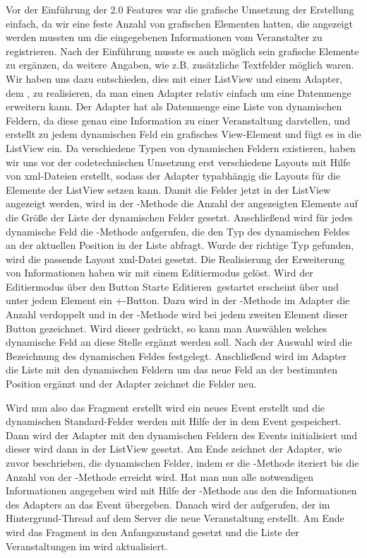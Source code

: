 Vor der Einführung der 2.0 Features war die grafische Umsetzung der Erstellung einfach, da wir eine feste Anzahl von grafischen Elementen hatten, die angezeigt werden mussten um die eingegebenen Informationen vom Veranstalter zu registrieren. Nach der Einführung musste es auch möglich sein grafische Elemente zu ergänzen, da weitere Angaben, wie z.B. zusätzliche Textfelder möglich waren. Wir haben uns dazu entschieden, dies mit einer ListView und einem Adapter, dem , zu realisieren, da man einen Adapter relativ einfach um eine Datenmenge erweitern kann. Der Adapter hat als Datenmenge eine Liste von dynamischen Feldern, da diese genau eine Information zu einer Veranstaltung darstellen, und erstellt zu jedem dynamischen Feld ein grafisches View-Element und fügt es in die ListView ein. Da verschiedene Typen von dynamischen Feldern existieren, haben wir uns vor der codetechnischen Umsetzung erst verschiedene Layouts mit Hilfe von xml-Dateien erstellt, sodass der Adapter typabhängig die Layouts für die Elemente der ListView setzen kann. Damit die Felder jetzt in der ListView angezeigt werden, wird in der -Methode die Anzahl der angezeigten Elemente auf die Größe der Liste der dynamischen Felder gesetzt. Anschließend wird für jedes dynamische Feld die -Methode aufgerufen, die den Typ des dynamischen Feldes an der aktuellen Position in der Liste abfragt. Wurde der richtige Typ gefunden, wird die passende Layout xml-Datei gesetzt. Die Realisierung der Erweiterung von Informationen haben wir mit einem Editiermodus gelöst. Wird der Editiermodus über den Button \glqq Starte Editieren\grqq\ gestartet erscheint über und unter jedem Element ein \glqq$+$\grqq-Button. Dazu wird in der -Methode im Adapter die Anzahl verdoppelt und in der -Methode wird bei jedem zweiten Element dieser Button gezeichnet. Wird dieser gedrückt, so kann man Auswählen welches dynamische Feld an diese Stelle ergänzt werden soll. Nach der Auswahl wird die Bezeichnung des dynamischen Feldes festgelegt. Anschließend wird im Adapter die Liste mit den dynamischen Feldern um das neue Feld an der bestimmten Position ergänzt und der Adapter zeichnet die Felder neu.

Wird nun also das Fragment erstellt wird ein neues Event erstellt und die dynamischen Standard-Felder werden mit Hilfe der  in dem Event gespeichert. Dann wird der Adapter mit den dynamischen Feldern des Events initialisiert und dieser wird dann in der ListView gesetzt. Am Ende zeichnet der Adapter, wie zuvor beschrieben, die dynamischen Felder, indem er die -Methode iteriert bis die Anzahl von der -Methode erreicht wird. Hat man nun alle notwendigen Informationen angegeben wird mit Hilfe der -Methode aus den  die Informationen des Adapters an das Event übergeben. Danach wird der  aufgerufen, der im Hintergrund-Thread auf dem Server die neue Veranstaltung erstellt. Am Ende wird das Fragment in den Anfangszustand gesetzt und die Liste der Veranstaltungen im  wird aktualisiert.

